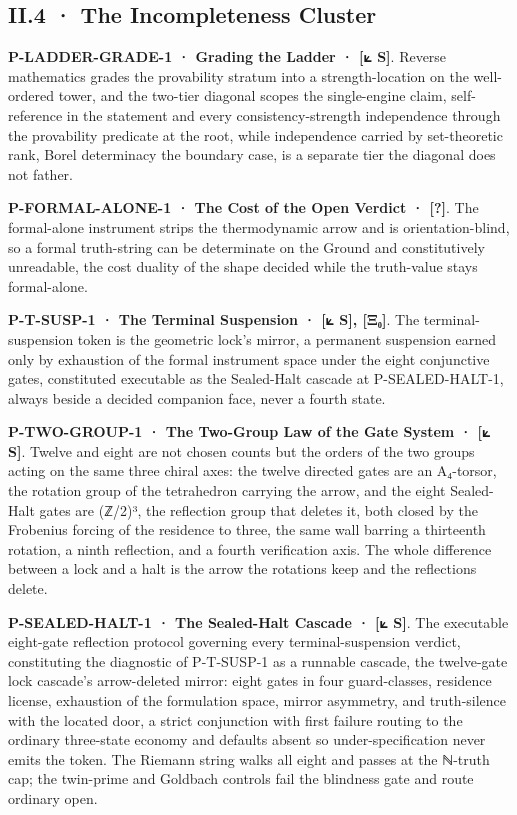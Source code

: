 \documentclass[10pt,twocolumn]{article}
\begin{document}
\hypertarget{ii.4-the-incompleteness-cluster}{%
\subsection{II.4 · The Incompleteness
Cluster}\label{ii.4-the-incompleteness-cluster}}

\textbf{P-LADDER-GRADE-1 · Grading the Ladder · {[}⟀ S{]}}. Reverse
mathematics grades the provability stratum into a strength-location on
the well-ordered tower, and the two-tier diagonal scopes the
single-engine claim, self-reference in the statement and every
consistency-strength independence through the provability predicate at
the root, while independence carried by set-theoretic rank, Borel
determinacy the boundary case, is a separate tier the diagonal does not
father.

\textbf{P-FORMAL-ALONE-1 · The Cost of the Open Verdict · {[}?{]}}. The
formal-alone instrument strips the thermodynamic arrow and is
orientation-blind, so a formal truth-string can be determinate on the
Ground and constitutively unreadable, the cost duality of the shape
decided while the truth-value stays formal-alone.

\textbf{P-T-SUSP-1 · The Terminal Suspension · {[}⟀ S{]}, {[}Ξ₀{]}}. The
terminal-suspension token is the geometric lock's mirror, a permanent
suspension earned only by exhaustion of the formal instrument space
under the eight conjunctive gates, constituted executable as the
Sealed-Halt cascade at P-SEALED-HALT-1, always beside a decided
companion face, never a fourth state.

\textbf{P-TWO-GROUP-1 · The Two-Group Law of the Gate System · {[}⟀
S{]}}. Twelve and eight are not chosen counts but the orders of the two
groups acting on the same three chiral axes: the twelve directed gates
are an A₄-torsor, the rotation group of the tetrahedron carrying the
arrow, and the eight Sealed-Halt gates are (ℤ/2)³, the reflection group
that deletes it, both closed by the Frobenius forcing of the residence
to three, the same wall barring a thirteenth rotation, a ninth
reflection, and a fourth verification axis. The whole difference between
a lock and a halt is the arrow the rotations keep and the reflections
delete.

\textbf{P-SEALED-HALT-1 · The Sealed-Halt Cascade · {[}⟀ S{]}}. The
executable eight-gate reflection protocol governing every
terminal-suspension verdict, constituting the diagnostic of P-T-SUSP-1
as a runnable cascade, the twelve-gate lock cascade's arrow-deleted
mirror: eight gates in four guard-classes, residence license, exhaustion
of the formulation space, mirror asymmetry, and truth-silence with the
located door, a strict conjunction with first failure routing to the
ordinary three-state economy and defaults absent so under-specification
never emits the token. The Riemann string walks all eight and passes at
the ℕ-truth cap; the twin-prime and Goldbach controls fail the blindness
gate and route ordinary open.
\end{document}
